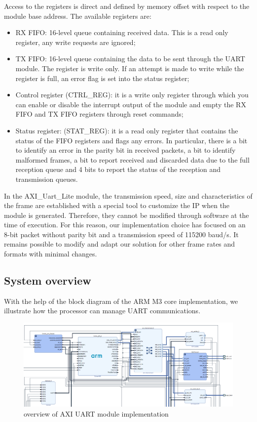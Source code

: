 \documentclass[11pt]{article}
\begin{document}
	Access to the registers is direct and defined by memory offset with respect to the module base address.
	The available registers are:
	\begin{itemize}
	\item RX FIFO: 16-level queue containing received data. This is a read only register, any write requests are ignored;
	\item TX FIFO: 16-level queue containing the data to be sent through the UART module. The register is write only. If an attempt is made to write while the register is full, an error flag is set into the status register;
	\item Control register (CTRL\_REG): it is a write only register through which you can enable or disable the interrupt output of the module and empty the RX FIFO and TX FIFO registers through reset commands;
	\item Status register: (STAT\_REG): it is a read only register that contains the status of the FIFO registers and flags any errors. In particular, there is a bit to identify an error in the parity bit in received packets, a bit to identify malformed frames, a bit to report received and discarded data due to the full reception queue and 4 bits to report the status of the reception and transmission queues.
	\end{itemize}
	In the AXI\_Uart\_Lite module, the transmission speed, size and characteristics of the frame are established with a special tool to customize the IP when the module is generated. Therefore, they cannot be modified through software at the time of execution. For this reason, our implementation choice has focused on an 8-bit packet without parity bit and a transmission speed of 115200 baud/s. It remains possible to modify and adapt our solution for other frame rates and formats with minimal changes.
	\subsection{System overview}
	With the  help of the block diagram of the ARM M3 core implementation, we illustrate how the processor can manage UART communications.\\
	\begin{figure}[H]
	\centering
	\includegraphics[height=0.55\textwidth, angle=90]{M3_block}
	\caption{overview of AXI UART module implementation}
	\end{figure} 
	
\end{document}

